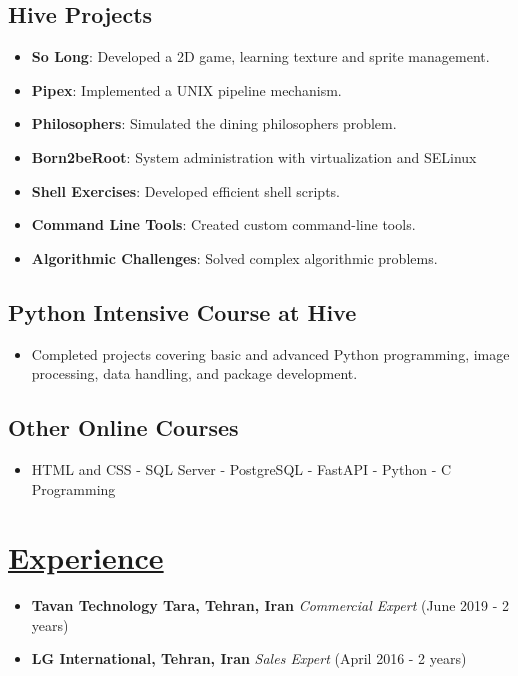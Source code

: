 \documentclass[a4paper,9pt]{article}
\newcommand{\mainsection}[1]{\underline{#1}}
\begin{document}
\subsection*{Hive Projects}
\setlength{\columnsep}{20pt} %
\begin{multicols}{2}
\begin{itemize}[leftmargin=*]
    \raggedcolumns %
    \item \textbf{So Long}: Developed a 2D game, learning texture and sprite management.
    \item \textbf{Pipex}: Implemented a UNIX pipeline mechanism.
    \item \textbf{Philosophers}: Simulated the dining philosophers problem.
    \item \textbf{Born2beRoot}: System administration with virtualization and SELinux
    \item \textbf{Shell Exercises}: Developed efficient shell scripts.
    \item \textbf{Command Line Tools}: Created custom command-line tools.
    \item \textbf{Algorithmic Challenges}: Solved complex algorithmic problems.
  \end{itemize}
\end{multicols}

\subsection*{Python Intensive Course at Hive}
\begin{itemize}[leftmargin=*]
  \item Completed projects covering basic and advanced Python programming, image processing, data handling, and package development.
\end{itemize}

\subsection*{Other Online Courses}
\begin{itemize}[leftmargin=*]
  \item HTML and CSS - SQL Server - PostgreSQL - FastAPI - Python - C Programming
\end{itemize}

\section*{\mainsection{Experience}}
\begin{itemize}[leftmargin=*]
  \item \textbf{Tavan Technology Tara, Tehran, Iran} \textit{Commercial Expert} (June 2019 - 2 years)
  \item \textbf{LG International, Tehran, Iran} \textit{Sales Expert} (April 2016 - 2 years)
\end{itemize}
\end{document}
